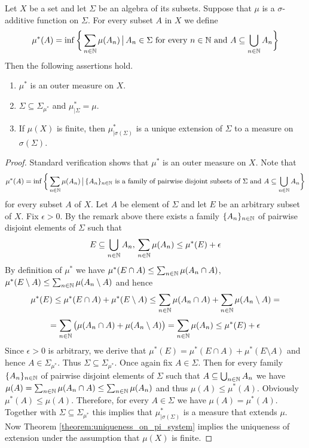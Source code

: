 \begin{theorem}\label{theorem:caratheodory_extension_result}
Let $X$ be a set and let $\Sigma$ be an algebra of its subsets. Suppose that $\mu$ is a $\sigma$-additive function on $\Sigma$. For every subset $A$ in $X$ we define
$$\mu^*(A) = \inf \bigg\{\sum_{n\in {\mathbb N}}\mu(A_n)\,\big|\,A_n\in \Sigma\mbox{ for every }n\in {\mathbb N}\mbox{ and }A\subseteq \bigcup_{n\in {\mathbb N}}A_n\bigg\}$$
Then the following assertions hold.
\begin{enumerate}[label=\emph{\textbf{(\arabic*)}}, leftmargin=*]
\item $\mu^*$ is an outer measure on $X$.
\item $\Sigma \subseteq \Sigma_{\mu^*}$ and $\mu^*_{\mid \Sigma} = \mu$.
\item If $\mu(X)$ is finite, then $\mu^*_{\mid \sigma(\Sigma)}$ is a unique extension of $\Sigma$ to a measure on $\sigma(\Sigma)$.
\end{enumerate}
\end{theorem}
\begin{proof}
Standard verification shows that $\mu^*$ is an outer measure on $X$. Note that 
$$\mu^*(A) = \inf \bigg\{\sum_{n\in {\mathbb N}}\mu(A_n)\,\big|\,\{A_n\}_{n\in {\mathbb N}}\mbox{ is a family of pairwise disjoint subsets of }\Sigma \mbox{ and }A\subseteq \bigcup_{n\in {\mathbb N}}A_n\bigg\}$$
for every subset $A$ of $X$. Let $A$ be element of $\Sigma$ and let $E$ be an arbitrary subset of $X$. Fix $\epsilon > 0$. By the remark above there exists a family $\{A_n\}_{n\in {\mathbb N}}$ of pairwise disjoint elements of $\Sigma$ such that
$$E\subseteq \bigcup_{n\in {\mathbb N}}A_n,\,\sum_{n\in {\mathbb N}}\mu(A_n)\leq \mu^*(E)+\epsilon$$
By definition of $\mu^*$ we have $\mu^*(E\cap A)\leq \sum_{n\in {\mathbb N}}\mu(A_n\cap A)$, $\mu^*(E\setminus A) \leq \sum_{n\in {\mathbb N}}\mu(A_n\setminus A)$ and hence
$$\mu^*(E)\leq \mu^*(E\cap A)+\mu^*(E\setminus A) \leq \sum_{n\in {\mathbb N}}\mu(A_n\cap A)+\sum_{n\in {\mathbb N}}\mu(A_n\setminus A)=$$
$$=\sum_{n\in {\mathbb N}}\big(\mu(A_n\cap A)+\mu(A_n\setminus A)\big)=\sum_{n\in {\mathbb N}}\mu(A_n)\leq \mu^*(E)+\epsilon$$
Since $\epsilon > 0$ is arbitrary, we derive that $\mu^*(E) = \mu^*(E\cap A)+\mu^*(E\setminus A)$ and hence $A\in \Sigma_{\mu^*}$. Thus $\Sigma \subseteq \Sigma_{\mu^*}$. Once again fix $A\in \Sigma$. Then for every family $\{A_n\}_{n\in {\mathbb N}}$ of pairwise disjoint elements of $\Sigma$ such that $A\subseteq \bigcup_{n\in {\mathbb N}}A_n$ we have $\mu(A) = \sum_{n\in {\mathbb N}}\mu(A_n\cap A)\leq \sum_{n\in {\mathbb N}}\mu(A_n)$ and thus $\mu(A)\leq \mu^*(A)$. Obviously $\mu^*(A)\leq \mu(A)$. Therefore, for every $A\in \Sigma$ we have $\mu(A) = \mu^*(A)$. Together with $\Sigma\subseteq \Sigma_{\mu^*}$ this implies that $\mu^*_{\mid \sigma(\Sigma)}$ is a measure that extends $\mu$. Now Theorem \ref{theorem:uniqueness_on_pi_system} implies the uniqueness of extension under the assumption that $\mu(X)$ is finite.
\end{proof}

